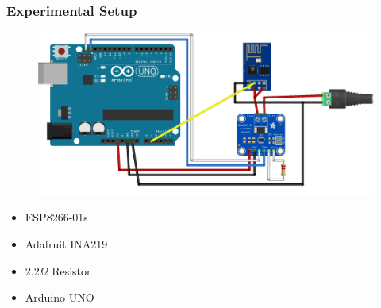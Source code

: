\begin{frame}
    \frametitle{Experimental Setup}
	\begin{minipage}[t]{0.60 \textwidth}
		\begin{figure}[H]
			\centering
			\vspace{20pt}
			\includegraphics[width = 1.4 \linewidth]{fig/experimental_setup.png}
		\end{figure}
	\end{minipage}
	\begin{minipage}[t]{0.30 \textwidth}
		\begin{itemize} 
			\item ESP8266-01s
			\item Adafruit INA219
			\item $2.2\Omega$ Resistor
			\item Arduino UNO
		\end{itemize}
	\end{minipage}
\end{frame}